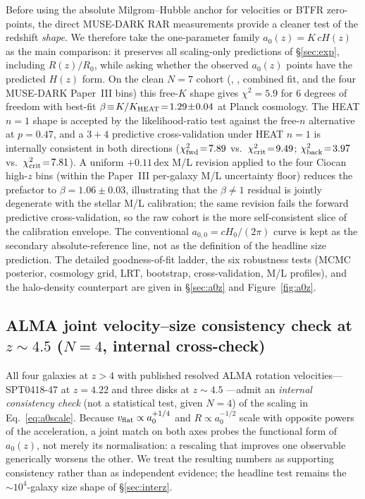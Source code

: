 \documentclass[twocolumn,letterpaper]{aastex631}
\newcommand{\azero}{a_0}
\newcommand{\azerolocal}{a_{0,0}}
\begin{document}
Before using the absolute Milgrom--Hubble anchor for velocities
or BTFR zero-points, the direct MUSE-DARK RAR measurements provide
a cleaner test of the redshift \emph{shape}.  We therefore take
the one-parameter family $\azero(z)=K\,cH(z)$ as the main
comparison: it preserves all scaling-only predictions of
\S\ref{sec:exp}, including $R(z)/R_{0}$, while asking whether the
observed $\azero(z)$ points have the predicted $H(z)$ form.
On the clean $N\!=\!7$ cohort (\citealt{McGaugh2016},
\citealt{Desmond2023}, \citealt{Varasteanu2025} combined fit,
and the four MUSE-DARK Paper~III bins) this free-$K$ shape gives
$\chi^{2}\!=\!5.9$ for $6$ degrees of freedom with best-fit
$\beta\!\equiv\!K/K_{\rm HEAT}\!=\!1.29\!\pm\!0.04$ at Planck
cosmology.  The HEAT $n\!=\!1$ shape is accepted by the
likelihood-ratio test against the free-$n$ alternative at
$p\!=\!0.47$, and a $3\!+\!4$ predictive cross-validation under
HEAT $n\!=\!1$ is internally consistent in both directions
($\chi^{2}_{\rm fwd}\!=\!7.89$ vs.\ $\chi^{2}_{\rm crit}\!=\!9.49$;
$\chi^{2}_{\rm back}\!=\!3.97$ vs.\ $\chi^{2}_{\rm crit}\!=\!7.81$).
A uniform $+0.11$\,dex M/L revision applied to the four Ciocan
high-$z$ bins (within the Paper~III per-galaxy M/L uncertainty
floor) reduces the prefactor to $\beta\!=\!1.06\!\pm\!0.03$,
illustrating that the $\beta\!\neq\!1$ residual is jointly
degenerate with the stellar M/L calibration; the same revision
fails the forward predictive cross-validation, so the raw
cohort is the more self-consistent slice of the calibration
envelope.  The conventional $\azerolocal=cH_0/(2\pi)$ curve is
kept as the secondary absolute-reference line, not as the
definition of the headline size prediction.  The detailed
goodness-of-fit ladder, the six robustness tests
(MCMC posterior, cosmology grid, LRT, bootstrap, cross-validation,
M/L profiles), and the halo-density counterpart are given in
\S\ref{sec:a0z} and Figure~\ref{fig:a0z}.

\subsection{ALMA joint velocity--size consistency check at
  $z\sim 4.5$ ($N=4$, internal cross-check)}\label{sec:alma}

All four galaxies at $z>4$ with published resolved ALMA
rotation velocities---SPT0418-47 at $z=4.22$ \citep{Rizzo2020}
and three disks at $z\sim 4.5$
\citep{RomanOliveira2023,RomanOliveira2024}---admit an
\emph{internal consistency check} (not a statistical test, given
$N=4$) of the scaling in Eq.~\ref{eq:a0scale}.  Because
$v_{\rm flat}\propto\azero^{+1/4}$ and $R\propto\azero^{-1/2}$
scale with opposite powers of the acceleration, a joint match
on both axes probes the functional form of $\azero(z)$, not
merely its normalisation: a rescaling that improves one
observable generically worsens the other.  We treat the
resulting numbers as supporting consistency rather than as
independent evidence; the headline test remains the
$\sim 10^{4}$-galaxy size shape of \S\ref{sec:interz}.
\end{document}
